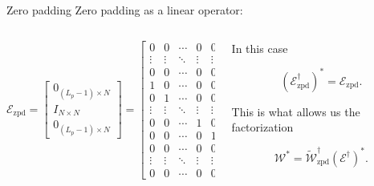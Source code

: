 \documentclass[xcolor=dvipsnames,t]{beamer} %
\begin{document}
\begin{frame}{Zero padding}
   Zero padding as a linear operator:

   \begin{columns}
      \begin{column}{0.7\textwidth}
\[ \mathcal{E}_\text{zpd} = \begin{bmatrix} 0_{(L_p-1)\times N}\\ I_{N\times N}\\ 0_{(L_p-1)\times N}\end{bmatrix} = \begin{bmatrix} 0 & 0 & \cdots & 0 & 0\\ \vdots & \vdots &\ddots & \vdots & \vdots\\ 0 & 0 & \cdots & 0 & 0\\[0.5em] 1 & 0 & \cdots & 0 & 0\\ 0 & 1 & \cdots & 0 & 0\\ \vdots & \vdots & \ddots & \vdots & \vdots\\ 0 & 0 & \cdots & 1 & 0\\ 0 & 0 & \cdots & 0 & 1\\[0.5em] 0 & 0 & \cdots & 0 & 0\\ \vdots & \vdots & \ddots & \vdots & \vdots\\ 0 & 0 & \cdots & 0 & 0\end{bmatrix}. \] 
      \end{column}

      \begin{column}{0.3\textwidth}
         In this case

         \[ \left(\mathcal{E}_\text{zpd}^\dagger\right)^\ast = \mathcal{E}_\text{zpd}. \] 

         \noindent This is what allows us the factorization

         \[ \mathcal{W}^\ast = \tilde{\mathcal{W}}_\text{zpd}^\dagger \left(\mathcal{E}^\dagger\right)^\ast. \] 


      \end{column}
   \end{columns}
\end{frame}
\end{document}
